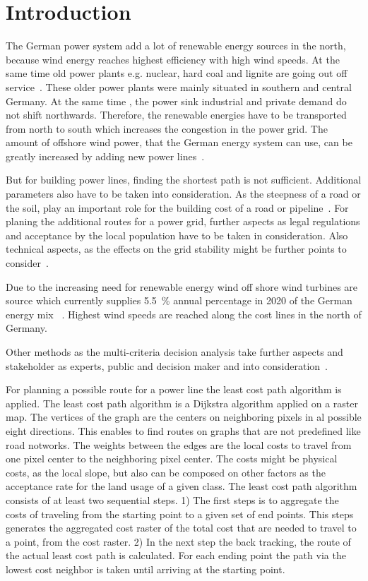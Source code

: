 \documentclass[acmtog]{acmart}
\begin{document}
	\section{Introduction}\label{sec:introduction}

	The German power system add a lot of renewable energy sources in the north, because wind energy reaches highest efficiency with high wind speeds.
	At the same time old power plants e.g. nuclear, hard coal and lignite are going out off service~\cite{eser-frey_analyzing_2012}.
	These older power plants were mainly situated in southern and central Germany. 
	At the same time , the power sink industrial and private demand do not shift northwards.
	Therefore, the renewable energies have to be transported from north to south which increases the congestion in the power grid. 
	The amount of offshore wind power, that the German energy system can use, can be greatly increased by adding new power lines~\cite{leuthold_nodal_2005}.
	
	But for building power lines, finding the shortest path is not sufficient.
	Additional parameters also have to be taken into consideration.
	As the steepness of a road or the soil, play an important role for the building cost of a road or pipeline~\cite{suleiman_optimal_2015}.
	For planing the additional routes for a power grid, further aspects as legal regulations and acceptance
	by the local population have to be taken in consideration.
	Also technical aspects, as the effects on the grid stability might be further points to consider~\cite{schafer_understanding_2022}.
	
	Due to the increasing need for renewable energy wind off shore wind turbines are source which currently supplies 5.5~\% annual percentage in 2020 of the German energy mix~\cite{noauthor_nettostromerzeugung_2021}
.	
	Highest wind speeds are reached along the cost lines in the north of Germany.

	Other methods as the multi-criteria decision analysis take further aspects and stakeholder as experts, public and decision maker and into consideration~\cite{bertsch_participatory_2016}.
	
	For planning a possible route for a power line the least cost path algorithm is applied.
	The least cost path algorithm is a Dijkstra algorithm applied on a raster map.
	The vertices of the graph are the centers on neighboring pixels in al possible eight directions.
	This enables to find routes on graphs that are not predefined like road notworks.
	The weights between the edges are the local costs to travel from one pixel center to the neighboring pixel center.
	The costs might be physical costs, as the local slope, but also can be composed on other factors as the acceptance rate for the land usage of a given class.
	The least cost path algorithm consists of at least two sequential steps.
	1) The first steps is to aggregate the costs of traveling from the starting point to a given set of end points.
	This steps generates the aggregated cost raster of the total cost that are needed to travel to a point, from the cost raster.
	2) In the next step the back tracking, the route of the actual least cost path is calculated.
	For each ending point the path via the lowest cost neighbor is taken until arriving at the starting point.
\end{document}
